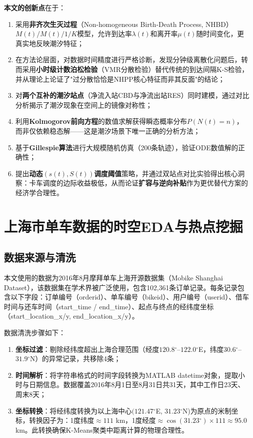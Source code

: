 \documentclass[12pt,a4paper]{article}
\begin{document}
\textbf{本文的创新点}在于：
\begin{enumerate}
    \item 采用\textbf{非齐次生灭过程}（Non-homogeneous Birth-Death Process, NHBD）$M(t)/M(t)/1/K$模型，允许到达率$\lambda(t)$和离开率$\mu(t)$随时间变化，更真实地反映潮汐特征；
    \item 在方法论层面，对数据时间精度进行严格诊断，发现分钟级离散化问题后，转而采用\textbf{小时级计数泊松检验}（VMR分散检验）替代传统的到达间隔K-S检验，并从理论上论证了"过分散恰恰是NHPP核心特征而非其反面"的结论；
    \item 对\textbf{两个互补的潮汐站点}（净流入站CBD与净流出站RES）同时建模，通过对比分析揭示了潮汐现象在空间上的镜像对称性；
    \item 利用\textbf{Kolmogorov前向方程}的数值求解获得瞬态概率分布$P(N(t)=n)$，而非仅依赖稳态解——这是潮汐场景下唯一正确的分析方法；
    \item 基于\textbf{Gillespie算法}进行大规模随机仿真（200条轨迹），验证ODE数值解的正确性；
    \item 提出\textbf{动态$(s(t),S(t))$调度阈值}策略，并通过双站点对比实验得出核心洞察：卡车调度的边际收益极低，从而论证\textbf{扩容与逆向补贴}作为更优替代方案的经济学合理性。
\end{enumerate}

\section{上海市单车数据的时空EDA与热点挖掘}

\subsection{数据来源与清洗}

本文使用的数据为2016年8月摩拜单车上海开源数据集（Mobike Shanghai Dataset）\cite{mobike_dataset}，该数据集在学术界被广泛使用\cite{mobike2018}，包含102,361条订单记录。每条记录包含以下字段：订单编号（orderid）、单车编号（bikeid）、用户编号（userid）、借车时间与还车时间（start\_time / end\_time）、起点与终点的经纬度坐标（start\_location\_x/y, end\_location\_x/y）。

数据清洗步骤如下：
\begin{enumerate}
    \item \textbf{坐标过滤}：剔除经纬度超出上海合理范围（经度$120.8{}^{\circ}$--$122.0{}^{\circ}$E，纬度$30.6{}^{\circ}$--$31.9{}^{\circ}$N）的异常记录，共移除4条；
    \item \textbf{时间解析}：将字符串格式的时间字段转换为MATLAB datetime对象，提取小时与日期信息。数据覆盖2016年8月1日至8月31日共31天，其中工作日23天、周末8天；
    \item \textbf{坐标转换}：将经纬度转换为以上海中心$(121.47{}^{\circ}$E, $31.23{}^{\circ}$N)为原点的米制坐标，转换因子为：1度纬度$\approx 111$ km，1度经度$\approx \cos(31.23{}^{\circ})\times 111 \approx 95.0$ km。此转换确保K-Means聚类中距离计算的物理合理性。
\end{enumerate}
\end{document}
